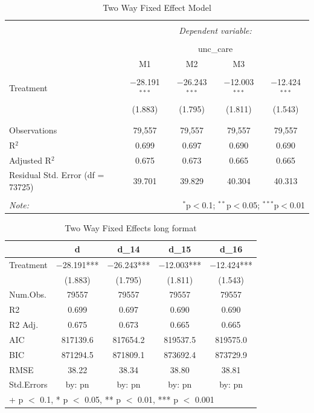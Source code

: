 \documentclass[
]{article}
\begin{document}
\begin{table}[H] \centering 
  \caption{Two Way Fixed Effect Model} 
  \label{table-3} 
\begin{tabular}{@{\extracolsep{5pt}}lcccc} 
\\[-1.8ex]\hline 
\hline \\[-1.8ex] 
 & \multicolumn{4}{c}{\textit{Dependent variable:}} \\ 
\cline{2-5} 
\\[-1.8ex] & \multicolumn{4}{c}{unc\_care} \\ 
 & M1 & M2 & M3 &  \\ 
\hline \\[-1.8ex] 
 Treatment & $-$28.191$^{***}$ & $-$26.243$^{***}$ & $-$12.003$^{***}$ & $-$12.424$^{***}$ \\ 
  & (1.883) & (1.795) & (1.811) & (1.543) \\ 
  & & & & \\ 
\hline \\[-1.8ex] 
Observations & 79,557 & 79,557 & 79,557 & 79,557 \\ 
R$^{2}$ & 0.699 & 0.697 & 0.690 & 0.690 \\ 
Adjusted R$^{2}$ & 0.675 & 0.673 & 0.665 & 0.665 \\ 
Residual Std. Error (df = 73725) & 39.701 & 39.829 & 40.304 & 40.313 \\ 
\hline 
\hline \\[-1.8ex] 
\textit{Note:}  & \multicolumn{4}{r}{$^{*}$p$<$0.1; $^{**}$p$<$0.05; $^{***}$p$<$0.01} \\ 
\end{tabular} 
\end{table}

\begin{table}

\caption{\label{tab:table-4}Two Way Fixed Effects long format}
\centering
\begin{tabular}[t]{lcccc}
\toprule
  & d & d\_14 & d\_15 & d\_16\\
\midrule
Treatment & \num{-28.191}*** & \num{-26.243}*** & \num{-12.003}*** & \num{-12.424}***\\
 & (\num{1.883}) & (\num{1.795}) & (\num{1.811}) & (\num{1.543})\\
\midrule
Num.Obs. & \num{79557} & \num{79557} & \num{79557} & \num{79557}\\
R2 & \num{0.699} & \num{0.697} & \num{0.690} & \num{0.690}\\
R2 Adj. & \num{0.675} & \num{0.673} & \num{0.665} & \num{0.665}\\
AIC & \num{817139.6} & \num{817654.2} & \num{819537.5} & \num{819575.0}\\
BIC & \num{871294.5} & \num{871809.1} & \num{873692.4} & \num{873729.9}\\
RMSE & \num{38.22} & \num{38.34} & \num{38.80} & \num{38.81}\\
Std.Errors & by: pn & by: pn & by: pn & by: pn\\
\bottomrule
\multicolumn{5}{l}{\rule{0pt}{1em}+ p $<$ 0.1, * p $<$ 0.05, ** p $<$ 0.01, *** p $<$ 0.001}\\
\end{tabular}
\end{table}
\end{document}
